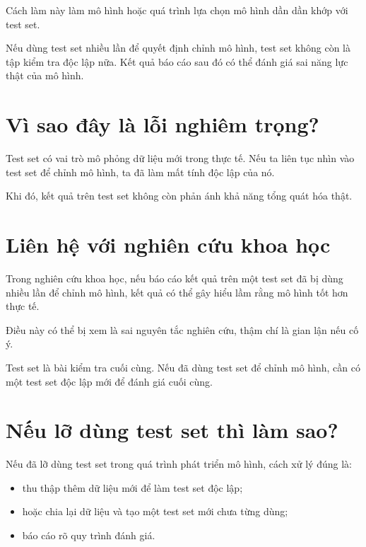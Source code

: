 \documentclass[12pt,a4paper]{report}
\begin{document}
Cách làm này làm mô hình hoặc quá trình lựa chọn mô hình dần dần khớp với test set.

\begin{canhbao}
Nếu dùng test set nhiều lần để quyết định chỉnh mô hình, test set không còn là tập kiểm tra độc lập nữa. Kết quả báo cáo sau đó có thể đánh giá sai năng lực thật của mô hình.
\end{canhbao}

\section{Vì sao đây là lỗi nghiêm trọng?}

Test set có vai trò mô phỏng dữ liệu mới trong thực tế. Nếu ta liên tục nhìn vào test set để chỉnh mô hình, ta đã làm mất tính độc lập của nó.

Khi đó, kết quả trên test set không còn phản ánh khả năng tổng quát hóa thật.

\section{Liên hệ với nghiên cứu khoa học}

Trong nghiên cứu khoa học, nếu báo cáo kết quả trên một test set đã bị dùng nhiều lần để chỉnh mô hình, kết quả có thể gây hiểu lầm rằng mô hình tốt hơn thực tế.

Điều này có thể bị xem là sai nguyên tắc nghiên cứu, thậm chí là gian lận nếu cố ý.

\begin{ghinho}
Test set là bài kiểm tra cuối cùng. Nếu đã dùng test set để chỉnh mô hình, cần có một test set độc lập mới để đánh giá cuối cùng.
\end{ghinho}

\section{Nếu lỡ dùng test set thì làm sao?}

Nếu đã lỡ dùng test set trong quá trình phát triển mô hình, cách xử lý đúng là:

\begin{itemize}
    \item thu thập thêm dữ liệu mới để làm test set độc lập;
    \item hoặc chia lại dữ liệu và tạo một test set mới chưa từng dùng;
    \item báo cáo rõ quy trình đánh giá.
\end{itemize}
\end{document}
